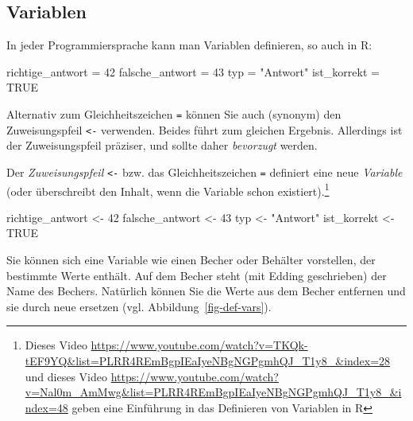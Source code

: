 \documentclass[
  letterpaper,
]{scrbook}
\newenvironment{Shaded}{\begin{snugshade}}{\end{snugshade}}
\newcommand{\ConstantTok}[1]{\textcolor[rgb]{0.56,0.35,0.01}{#1}}
\newcommand{\DecValTok}[1]{\textcolor[rgb]{0.68,0.00,0.00}{#1}}
\newcommand{\NormalTok}[1]{\textcolor[rgb]{0.00,0.23,0.31}{#1}}
\newcommand{\OtherTok}[1]{\textcolor[rgb]{0.00,0.23,0.31}{#1}}
\newcommand{\StringTok}[1]{\textcolor[rgb]{0.13,0.47,0.30}{#1}}
\theoremstyle{definition}
\theoremstyle{definition}
\theoremstyle{definition}
\theoremstyle{remark}
\begin{document}
\subsection{Variablen}\label{sec-rvars}

In jeder Programmiersprache kann man Variablen definieren, so auch in R:

\begin{Shaded}
\begin{Highlighting}[]
\NormalTok{richtige\_antwort }\OtherTok{=} \DecValTok{42}
\NormalTok{falsche\_antwort }\OtherTok{=} \DecValTok{43}
\NormalTok{typ }\OtherTok{=} \StringTok{"Antwort"}
\NormalTok{ist\_korrekt }\OtherTok{=} \ConstantTok{TRUE}
\end{Highlighting}
\end{Shaded}

Alternativ zum Gleichheitszeichen \texttt{=} können Sie auch (synonym)
den Zuweisungspfeil \texttt{\textless{}-} verwenden. Beides führt zum
gleichen Ergebnis. Allerdings ist der Zuweisungspfeil präziser, und
sollte daher \emph{bevorzugt} werden.

Der \emph{Zuweisungspfeil} \texttt{\textless{}-} bzw. das
Gleichheitszeichen \texttt{=} definiert eine neue \emph{Variable} (oder
überschreibt den Inhalt, wenn die Variable schon existiert).\footnote{Dieses
  Video
  \url{https://www.youtube.com/watch?v=TKQk-tEF9YQ&list=PLRR4REmBgpIEaIyeNBgNGPgmhQJ_T1y8_&index=28}
  und dieses Video
  \url{https://www.youtube.com/watch?v=Nal0m_AmMwg&list=PLRR4REmBgpIEaIyeNBgNGPgmhQJ_T1y8_&index=48}
  geben eine Einführung in das Definieren von Variablen in R}

\begin{Shaded}
\begin{Highlighting}[]
\NormalTok{richtige\_antwort }\OtherTok{\textless{}{-}} \DecValTok{42}
\NormalTok{falsche\_antwort }\OtherTok{\textless{}{-}} \DecValTok{43}
\NormalTok{typ }\OtherTok{\textless{}{-}} \StringTok{"Antwort"}
\NormalTok{ist\_korrekt }\OtherTok{\textless{}{-}} \ConstantTok{TRUE}
\end{Highlighting}
\end{Shaded}

Sie können sich eine Variable wie einen Becher oder Behälter vorstellen,
der bestimmte Werte enthält. Auf dem Becher steht (mit Edding
geschrieben) der Name des Bechers. Natürlich können Sie die Werte aus
dem Becher entfernen und sie durch neue ersetzen (vgl.
Abbildung~\ref{fig-def-vars}).
\end{document}
